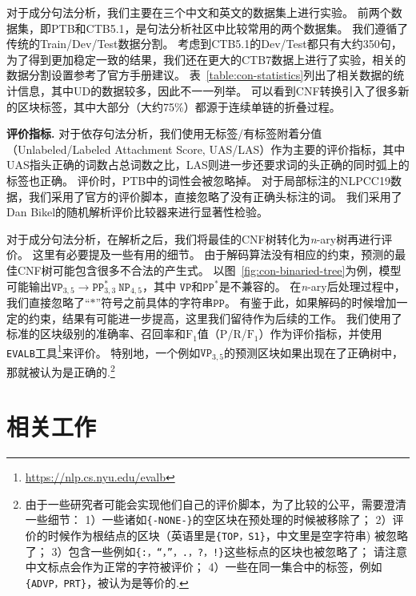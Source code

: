 对于成分句法分析，我们主要在三个中文和英文的数据集上进行实验。
前两个数据集，即PTB和CTB5.1，是句法分析社区中比较常用的两个数据集。
我们遵循了传统的Train/Dev/Test数据分割。
考虑到CTB5.1的Dev/Test都只有大约350句，为了得到更加稳定一致的结果，我们还在更大的CTB7数据上进行了实验，相关的数据分割设置参考了官方手册建议。
表~\ref{table:con-statistics}列出了相关数据的统计信息，其中UD的数据较多，因此不一一列举。
可以看到CNF转换引入了很多新的区块标签，其中大部分（大约75\%）都源于连续单链的折叠过程。



\noindent\textbf{评价指标.}
对于依存句法分析，我们使用无标签/有标签附着分值（Unlabeled/Labeled Attachment Score, UAS/LAS）作为主要的评价指标，其中UAS指头正确的词数占总词数之比，LAS则进一步还要求词的头正确的同时弧上的标签也正确。
评价时，PTB中的词性会被忽略掉。
对于局部标注的NLPCC19数据，我们采用了官方的评价脚本，直接忽略了没有正确头标注的词。
我们采用了Dan Bikel的随机解析评价比较器来进行显著性检验。

对于成分句法分析，在解析之后，我们将最佳的CNF树转化为\textit{n}-ary树再进行评价。
这里有必要提及一些有用的细节。
由于解码算法没有相应的约束，预测的最佳CNF树可能包含很多不合法的产生式。
以图~\ref{fig:con-binaried-tree}为例，模型可能输出$\texttt{VP}_{3,5} \rightarrow \texttt{PP}^{\ast}_{3,3} ~ \texttt{NP}_{4,5}$，其中 $\texttt{VP}$和$\texttt{PP}^{\ast}$是不兼容的。
在\textit{n}-ary后处理过程中，我们直接忽略了``$\mathtt{\ast}$''符号之前具体的字符串$\texttt{PP}$。
有鉴于此，如果解码的时候增加一定的约束，结果有可能进一步提高，这里我们留待作为后续的工作。
我们使用了标准的区块级别的准确率、召回率和$\mathrm{F}_1$值（$\mathrm{P}$/$\mathrm{R}$/$\mathrm{F}_1$）作为评价指标，并使用\texttt{EVALB}工具\footnote{\url{https://nlp.cs.nyu.edu/evalb}}来评价。
特别地，一个例如$\texttt{VP}_{3,5}$的预测区块如果出现在了正确树中，那就被认为是正确的.\footnote{
	由于一些研究者可能会实现他们自己的评价脚本，为了比较的公平，需要澄清一些细节：
	1）一些诸如\texttt{\{-NONE-\}}的空区块在预处理的时候被移除了；
	2）评价的时候作为根结点的区块（英语里是\texttt{\{TOP，S1\}}，中文里是空字符串) 被忽略了；
	3）包含一些例如\texttt{\{:，``，''，.，?，!\}}这些标点的区块也被忽略了；
	请注意中文标点会作为正常的字符被评价；
	4）一些在同一集合中的标签，例如\texttt{\{ADVP，PRT\}}，被认为是等价的.}

\section{相关工作}
\label{sec:relworks}


